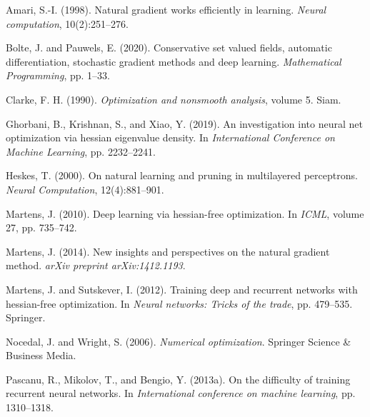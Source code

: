 \documentclass[11pt]{article}
\begin{document}

\begin{thebibliography}{10}
  Amari, S.-I. (1998).
  \newblock Natural gradient works efficiently in learning.
  \newblock \textit{Neural computation}, 10(2):251--276.

  Bolte, J. and Pauwels, E. (2020).
  \newblock Conservative set valued fields, automatic differentiation, stochastic gradient methods and deep learning.
  \newblock \textit{Mathematical Programming}, pp. 1--33.

  Clarke, F. H. (1990).
  \newblock \textit{Optimization and nonsmooth analysis}, volume 5.
  \newblock Siam.

  Ghorbani, B., Krishnan, S., and Xiao, Y. (2019).
  \newblock An investigation into neural net optimization via hessian eigenvalue density.
  \newblock In \textit{International Conference on Machine Learning}, pp. 2232--2241.

  Heskes, T. (2000).
  \newblock On natural learning and pruning in multilayered perceptrons.
  \newblock \textit{Neural Computation}, 12(4):881--901.

  Martens, J. (2010).
  \newblock Deep learning via hessian-free optimization.
  \newblock In \textit{ICML}, volume 27, pp. 735--742.

  Martens, J. (2014).
  \newblock New insights and perspectives on the natural gradient method.
  \newblock \textit{arXiv preprint arXiv:1412.1193}.

  Martens, J. and Sutskever, I. (2012).
  \newblock Training deep and recurrent networks with hessian-free optimization.
  \newblock In \textit{Neural networks: Tricks of the trade}, pp. 479--535. Springer.

  Nocedal, J. and Wright, S. (2006).
  \newblock \textit{Numerical optimization}.
  \newblock Springer Science \& Business Media.

  Pascanu, R., Mikolov, T., and Bengio, Y. (2013a).
  \newblock On the difficulty of training recurrent neural networks.
  \newblock In \textit{International conference on machine learning}, pp. 1310--1318.


\end{thebibliography}
\end{document}
